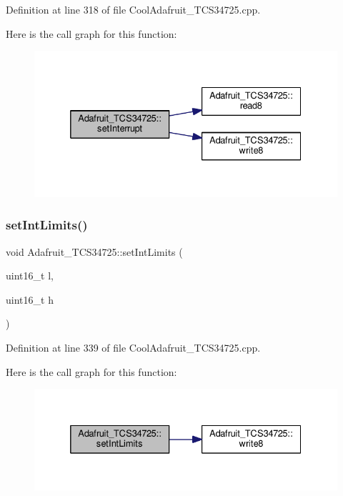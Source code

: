 Definition at line 318 of file Cool\+Adafruit\+\_\+\+T\+C\+S34725.\+cpp.

Here is the call graph for this function\+:
\nopagebreak
\begin{figure}[H]
\begin{center}
\leavevmode
\includegraphics[width=332pt]{class_adafruit___t_c_s34725_ae477b116ac93cf075be20637207aee57_cgraph}
\end{center}
\end{figure}
\mbox{\label{class_adafruit___t_c_s34725_ac17b2447df066e30d1e64fe764f88770}} 
\subsubsection{\texorpdfstring{set\+Int\+Limits()}{setIntLimits()}}
{\footnotesize\ttfamily void Adafruit\+\_\+\+T\+C\+S34725\+::set\+Int\+Limits (\begin{DoxyParamCaption}\item[{uint16\+\_\+t}]{l,  }\item[{uint16\+\_\+t}]{h }\end{DoxyParamCaption})}



Definition at line 339 of file Cool\+Adafruit\+\_\+\+T\+C\+S34725.\+cpp.

Here is the call graph for this function\+:
\nopagebreak
\begin{figure}[H]
\begin{center}
\leavevmode
\includegraphics[width=332pt]{class_adafruit___t_c_s34725_ac17b2447df066e30d1e64fe764f88770_cgraph}
\end{center}
\end{figure}
\mbox{\label{class_adafruit___t_c_s34725_aa526557ad0d76b3b6e31e6197de583e6}} 
